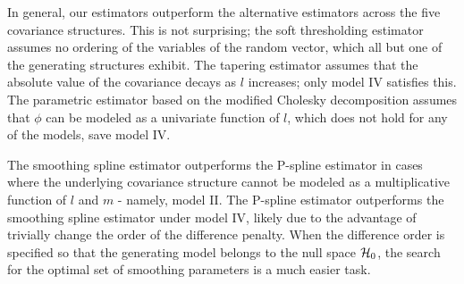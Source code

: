 \bigskip

In general, our estimators outperform the alternative estimators across the five covariance structures. This is not surprising; the soft thresholding estimator assumes no ordering of the variables of the random vector, which all but one of the generating structures exhibit. The tapering estimator assumes that the absolute value of the covariance decays as $l$ increases; only model IV satisfies this. The parametric estimator based on the modified Cholesky decomposition assumes that $\phi$ can be modeled as a univariate function of $l$, which does not hold for any of the models, save model IV.

\bigskip

The smoothing spline estimator outperforms the P-spline estimator in cases where the underlying covariance structure cannot be modeled as a multiplicative function of $l$ and $m$ - namely, model II. The P-spline estimator outperforms the smoothing spline estimator under model IV, likely due to the advantage of trivially change the order of the difference penalty. When the difference order is specified so that the generating model belongs to the null space $\mathcal{H}_0$, the search for the optimal set of smoothing parameters is a much easier task.   
 
